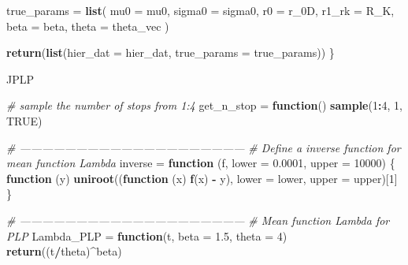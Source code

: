 \documentclass[
]{article}
\newenvironment{Shaded}{\begin{snugshade}}{\end{snugshade}}
\newcommand{\CommentTok}[1]{\textcolor[rgb]{0.56,0.35,0.01}{\textit{#1}}}
\newcommand{\ControlFlowTok}[1]{\textcolor[rgb]{0.13,0.29,0.53}{\textbf{#1}}}
\newcommand{\DataTypeTok}[1]{\textcolor[rgb]{0.13,0.29,0.53}{#1}}
\newcommand{\DecValTok}[1]{\textcolor[rgb]{0.00,0.00,0.81}{#1}}
\newcommand{\FloatTok}[1]{\textcolor[rgb]{0.00,0.00,0.81}{#1}}
\newcommand{\KeywordTok}[1]{\textcolor[rgb]{0.13,0.29,0.53}{\textbf{#1}}}
\newcommand{\NormalTok}[1]{#1}
\newcommand{\OperatorTok}[1]{\textcolor[rgb]{0.81,0.36,0.00}{\textbf{#1}}}
\newcommand{\OtherTok}[1]{\textcolor[rgb]{0.56,0.35,0.01}{#1}}
\newcommand{\StringTok}[1]{\textcolor[rgb]{0.31,0.60,0.02}{#1}}
\begin{document}
\begin{Shaded}
\begin{Highlighting}[]
\NormalTok{  true_params =}\StringTok{ }\KeywordTok{list}\NormalTok{(}
    \DataTypeTok{mu0 =}\NormalTok{ mu0, }\DataTypeTok{sigma0 =}\NormalTok{ sigma0,}
    \DataTypeTok{r0 =}\NormalTok{ r_0D, }\DataTypeTok{r1_rk =}\NormalTok{ R_K,}
    \DataTypeTok{beta =}\NormalTok{ beta,}
    \DataTypeTok{theta =}\NormalTok{ theta_vec}
\NormalTok{  )}

  \KeywordTok{return}\NormalTok{(}\KeywordTok{list}\NormalTok{(}\DataTypeTok{hier_dat =}\NormalTok{ hier_dat, }\DataTypeTok{true_params =}\NormalTok{ true_params))}
\NormalTok{\}}
\end{Highlighting}
\end{Shaded}

JPLP

\begin{Shaded}
\begin{Highlighting}[]
\CommentTok{# sample the number of stops from 1:4}
\NormalTok{get_n_stop =}\StringTok{ }\ControlFlowTok{function}\NormalTok{() }\KeywordTok{sample}\NormalTok{(}\DecValTok{1}\OperatorTok{:}\DecValTok{4}\NormalTok{, }\DecValTok{1}\NormalTok{, }\OtherTok{TRUE}\NormalTok{)}

\CommentTok{# ------------------------------------------------------------}
\CommentTok{# Define a inverse function for mean function Lambda}
\NormalTok{inverse =}\StringTok{ }\ControlFlowTok{function}\NormalTok{ (f, }\DataTypeTok{lower =} \FloatTok{0.0001}\NormalTok{, }\DataTypeTok{upper =} \DecValTok{10000}\NormalTok{) \{}
  \ControlFlowTok{function}\NormalTok{ (y) }\KeywordTok{uniroot}\NormalTok{((}\ControlFlowTok{function}\NormalTok{ (x) }\KeywordTok{f}\NormalTok{(x) }\OperatorTok{-}\StringTok{ }\NormalTok{y), }\DataTypeTok{lower =}\NormalTok{ lower, }\DataTypeTok{upper =}\NormalTok{ upper)[}\DecValTok{1}\NormalTok{]}
\NormalTok{\}}

\CommentTok{# ------------------------------------------------------------}
\CommentTok{# Mean function Lambda for PLP}
\NormalTok{Lambda_PLP =}\StringTok{ }\ControlFlowTok{function}\NormalTok{(t, }\DataTypeTok{beta =} \FloatTok{1.5}\NormalTok{, }\DataTypeTok{theta =} \DecValTok{4}\NormalTok{) }\KeywordTok{return}\NormalTok{((t}\OperatorTok{/}\NormalTok{theta)}\OperatorTok{^}\NormalTok{beta)}


\end{Highlighting}
\end{Shaded}
\end{document}
